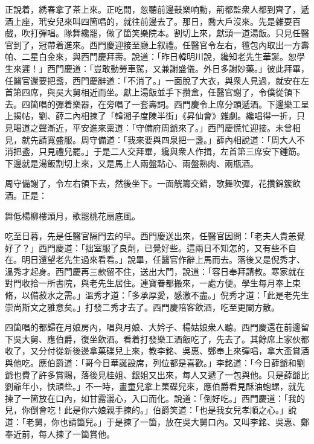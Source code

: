 正說着，綉春拿了茶上來。正吃間，忽聽前邊鼓樂响動，荊都監衆人都到齊了，遞酒上座，玳安兒來叫四箇唱的，就往前邊去了。那日，喬大戶沒來。先是雜耍百戲，吹打彈唱。隊舞纔罷，做了箇笑樂院本。割切上來，獻頭一道湯飯。只見任醫官到了，冠帶着進來。西門慶迎接至廳上叙禮。任醫官令左右，氊包內取出一方壽帕、二星白金來，與西門慶拜壽。說道：「昨日韓明川說，纔知老先生華誕。恕學生來遲！」西門慶道：「豈敢動勞車駕，又兼謝盛儀。外日多謝妙藥。」彼此拜畢，任醫官還要把盞，西門慶辭道：「不消了。」一面脫了大衣，與衆人見過，就安在左首第四席，與吳大舅相近而坐。獻上湯飯並手下攢盒，任醫官謝了，令僕從領下去。四箇唱的彈着樂器，在旁唱了一套壽詞。西門慶令上席分頭遞酒。下邊樂工呈上揭帖，劉、薛二內相揀了「韓湘子度陳半街」《昇仙會》雜劇。纔唱得一折，只見喝道之聲漸近，平安進來稟道：「守備府周爺來了。」西門慶慌忙迎接。未曾相見，就先請寬盛服。周守備道：「我來要與四泉把一盞。」薛內相說道：「周大人不消把盞，只見禮兒罷。」于是二人交拜畢，纔與衆人作揖，左首第三席安下鍾筯。下邊就是湯飯割切上來，又是馬上人兩盤點心、兩盤熟肉、兩瓶酒。

周守備謝了，令左右領下去，然後坐下。一面觥籌交錯，歌舞吹彈，花攢錦簇飲酒。正是：

\begin{myquote} 
舞低楊柳樓頭月，歌罷桃花扇底風。
\end{myquote} 

吃至日暮，先是任醫官隔門去的早。西門慶送出來，任醫官因問：「老夫人貴恙覺好了？」西門慶道：「拙室服了良劑，已覺好些。這兩日不知怎的，又有些不自在。明日還望老先生過來看看。」說畢，任醫官作辭上馬而去。落後又是倪秀才、溫秀才起身。西門慶再三款留不住，送出大門，說道：「容日奉拜請教。寒家就在對門收拾一所書院，與老先生居住。連寶眷都搬來，一處方便。學生每月奉上束脩，以備菽水之需。」溫秀才道：「多承厚愛，感激不盡。」倪秀才道：「此是老先生崇尚斯文之雅意矣。」打發二秀才去了。西門慶陪客飲酒，吃至更闌方散。

四箇唱的都歸在月娘房內，唱與月娘、大妗子、楊姑娘衆人聽。西門慶還在前邊留下吳大舅、應伯爵，復坐飲酒。看着打發樂工酒飯吃了，先去了。其餘席上家伙都收了，又分付從新後邊拿菓碟兒上來，教李銘、吳惠、鄭奉上來彈唱，拿大盃賞酒與他吃。應伯爵道：「哥今日華誕設席，列位都是喜歡。」李銘道：「今日薛爺和劉爺也費了許多賞賜，落後見桂姐、銀姐又出來，每人又遞了一包與他。只是薛爺比劉爺年小，快頑些。」不一時，畫童兒拿上菓碟兒來，應伯爵看見酥油蚫螺，就先揀了一箇放在口內，如甘露灑心，入口而化。說道：「倒好吃。」西門慶道：「我的兒，你倒會吃！此是你六娘親手揀的。」伯爵笑道：「也是我女兒孝順之心。」說道：「老舅，你也請箇兒。」于是揀了一箇，放在吳大舅口內。又叫李銘、吳惠、鄭奉近前，每人揀了一箇賞他。

